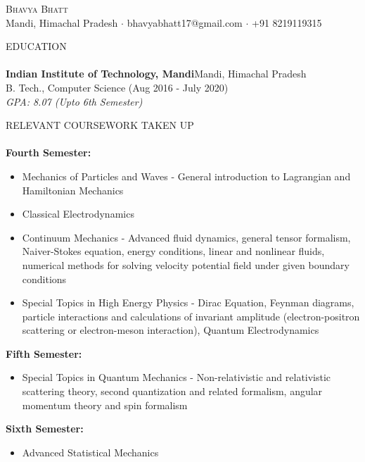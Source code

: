\documentclass[a4paper]{article}
\newcommand{\lineunder} {
    \vspace*{-8pt} \\
    \hspace*{-18pt} \hrulefill \\
}
\newcommand{\header} [1] {
    {\hspace*{-18pt}\vspace*{6pt} \textsc{#1}}
    \vspace*{-6pt} \lineunder
}
\begin{document}
\vspace*{-40pt}

    

\vspace*{-10pt}
\begin{center}
    {\Huge \scshape {Bhavya Bhatt}}\\
    Mandi, Himachal Pradesh $\cdot$ bhavyabhatt17@gmail.com $\cdot$ +91 8219119315\\
\end{center}

\header{EDUCATION}
\textbf{Indian Institute of Technology, Mandi}\hfill Mandi, Himachal Pradesh\\
B. Tech., Computer Science (Aug 2016 - July 2020)\\
 \textit{GPA: 8.07 (Upto 6th Semester)}
\vspace{2mm}

\header{RELEVANT COURSEWORK TAKEN UP}
\textbf{Fourth Semester: }
\begin{itemize} \itemsep 1pt
    \item Mechanics of Particles and Waves - General introduction to Lagrangian and Hamiltonian Mechanics\\
    \item Classical Electrodynamics\\
    \item Continuum Mechanics - Advanced fluid dynamics, general tensor formalism, Naiver-Stokes equation, energy conditions, linear and nonlinear fluids, numerical methods for solving velocity potential field under given boundary conditions\\
    \item Special Topics in High Energy Physics - Dirac Equation, Feynman diagrams, particle interactions and calculations of invariant amplitude (electron-positron scattering or electron-meson interaction), Quantum Electrodynamics \\
\end{itemize}
\textbf{Fifth Semester: }
\begin{itemize} \itemsep 1pt
    \item Special Topics in Quantum Mechanics - Non-relativistic and relativistic scattering theory, second quantization and related formalism, angular momentum theory and spin formalism\\
\end{itemize}
\textbf{Sixth Semester: }
\begin{itemize} \itemsep 1pt
    \item Advanced Statistical Mechanics\\
\end{itemize}
\vspace{2mm}
\end{document}
